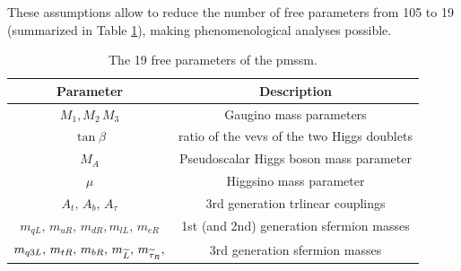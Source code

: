 These assumptions allow to reduce the number of free parameters from 105 to 19 (summarized in Table \ref{tab:pMMSpar}), making phenomenological analyses possible.


\begin{table}[h]
\centering
\begin{tabular}{c c}
\hline 
Parameter & Description \\ 
\hline 
\hline
$M_1, M_2  \, M_3 $ & Gaugino mass parameters \\ 
\hline 
$\tan \beta$ & ratio of the \glspl{vev} of the two Higgs doublets \\ 
\hline 
$M_A$ & Pseudoscalar Higgs boson mass parameter \\ 
\hline 
$\mu$ & Higgsino mass parameter \\ 
\hline 
$  A_t, \, A_b, \, A_\tau    $ & 3rd generation trlinear couplings \\ 
\hline 
$m_{qL},  \,  m_{uR},  \, m_{dR},  m_{lL},  \, m_{eR}$ & 1st (and 2nd) generation sfermion masses \\ 
\hline 
 $m_{q3L}, \, m_{tR}, \, m_{bR}, \, m_{\widetilde{L}}, \, m_{\widetilde{\tau}_R},$ & 3rd generation sfermion masses \\ 
\hline 
\end{tabular} 
\caption[Free parameters of the \gls{pmssm}]{\label{tab:pMMSpar}The 19 free parameters of the \gls{pmssm}.}
\end{table}





